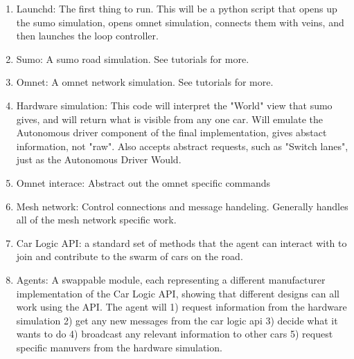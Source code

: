 \documentclass[11pt]{article}
\begin{document}
	\begin{enumerate}
		\item Launchd: The first thing to run. This will be a python script
			that opens up the sumo simulation, opens omnet simulation, connects them
			with veins, and then launches the loop controller.
		\item Sumo: A sumo road simulation. See tutorials for more.
		\item Omnet: A omnet network simulation. See tutorials for more.
		\item Hardware simulation: This code will interpret the "World" view that
			sumo gives, and will return what is visible from any one car. Will emulate
			the Autonomous driver component of the final implementation, gives abstact
			information, not "raw". Also accepts abstract requests, such as "Switch lanes",
			just as the Autonomous Driver Would.
		\item Omnet interace: Abstract out the omnet specific commands
		\item Mesh network: Control connections and message handeling. Generally
			handles all of the mesh network specific work.
		\item Car Logic API: a standard set of methods that the agent can interact
			with to join and contribute to the swarm of cars on the road.
		\item Agents: A swappable module, each representing a different manufacturer
			implementation of the Car Logic API, showing that different designs can
			all work using the API. The agent will 1) request information from the
			hardware simulation 2) get any new messages from the car logic api 3) decide
			what it wants to do 4) broadcast any relevant information to other cars
			5) request specific manuvers from the hardware simulation.
	\end{enumerate}
\end{document}
